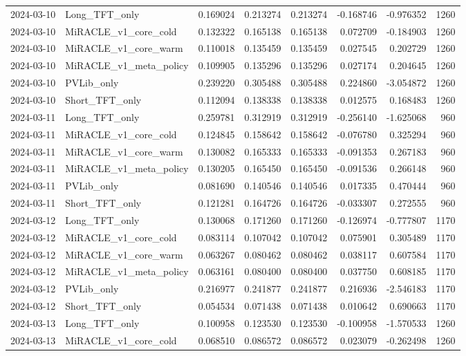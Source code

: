 \begin{tabular}{llrrrrrr}
2024-03-10 & Long_TFT_only & 0.169024 & 0.213274 & 0.213274 & -0.168746 & -0.976352 & 1260 \\
2024-03-10 & MiRACLE_v1_core_cold & 0.132322 & 0.165138 & 0.165138 & 0.072709 & -0.184903 & 1260 \\
2024-03-10 & MiRACLE_v1_core_warm & 0.110018 & 0.135459 & 0.135459 & 0.027545 & 0.202729 & 1260 \\
2024-03-10 & MiRACLE_v1_meta_policy & 0.109905 & 0.135296 & 0.135296 & 0.027174 & 0.204645 & 1260 \\
2024-03-10 & PVLib_only & 0.239220 & 0.305488 & 0.305488 & 0.224860 & -3.054872 & 1260 \\
2024-03-10 & Short_TFT_only & 0.112094 & 0.138338 & 0.138338 & 0.012575 & 0.168483 & 1260 \\
2024-03-11 & Long_TFT_only & 0.259781 & 0.312919 & 0.312919 & -0.256140 & -1.625068 & 960 \\
2024-03-11 & MiRACLE_v1_core_cold & 0.124845 & 0.158642 & 0.158642 & -0.076780 & 0.325294 & 960 \\
2024-03-11 & MiRACLE_v1_core_warm & 0.130082 & 0.165333 & 0.165333 & -0.091353 & 0.267183 & 960 \\
2024-03-11 & MiRACLE_v1_meta_policy & 0.130205 & 0.165450 & 0.165450 & -0.091536 & 0.266148 & 960 \\
2024-03-11 & PVLib_only & 0.081690 & 0.140546 & 0.140546 & 0.017335 & 0.470444 & 960 \\
2024-03-11 & Short_TFT_only & 0.121281 & 0.164726 & 0.164726 & -0.033307 & 0.272555 & 960 \\
2024-03-12 & Long_TFT_only & 0.130068 & 0.171260 & 0.171260 & -0.126974 & -0.777807 & 1170 \\
2024-03-12 & MiRACLE_v1_core_cold & 0.083114 & 0.107042 & 0.107042 & 0.075901 & 0.305489 & 1170 \\
2024-03-12 & MiRACLE_v1_core_warm & 0.063267 & 0.080462 & 0.080462 & 0.038117 & 0.607584 & 1170 \\
2024-03-12 & MiRACLE_v1_meta_policy & 0.063161 & 0.080400 & 0.080400 & 0.037750 & 0.608185 & 1170 \\
2024-03-12 & PVLib_only & 0.216977 & 0.241877 & 0.241877 & 0.216936 & -2.546183 & 1170 \\
2024-03-12 & Short_TFT_only & 0.054534 & 0.071438 & 0.071438 & 0.010642 & 0.690663 & 1170 \\
2024-03-13 & Long_TFT_only & 0.100958 & 0.123530 & 0.123530 & -0.100958 & -1.570533 & 1260 \\
2024-03-13 & MiRACLE_v1_core_cold & 0.068510 & 0.086572 & 0.086572 & 0.023079 & -0.262498 & 1260 \\

\end{tabular}
